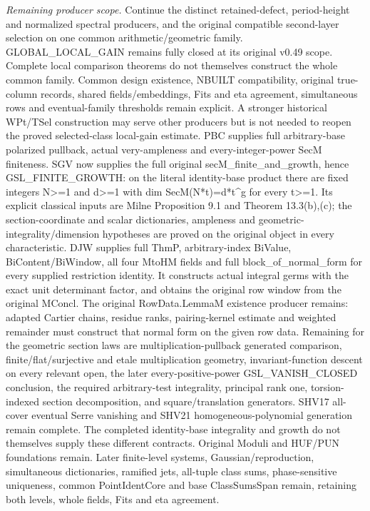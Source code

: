 \emph{Remaining producer scope.} Continue the distinct retained-defect, period-height and normalized spectral producers, and the original compatible second-layer selection on one common arithmetic/geometric family. GLOBAL\_\allowbreak LOCAL\_\allowbreak GAIN remains fully closed at its original v0.49 scope. Complete local comparison theorems do not themselves construct the whole common family. Common design existence, NBUILT compatibility, original true-column records, shared fields/embeddings, Fits and eta agreement, simultaneous rows and eventual-family thresholds remain explicit. A stronger historical WPt/TSel construction may serve other producers but is not needed to reopen the proved selected-class local-gain estimate. PBC supplies full arbitrary-base polarized pullback, actual very-ampleness and every-integer-power SecM finiteness. SGV now supplies the full original secM\_\allowbreak finite\_\allowbreak and\_\allowbreak growth, hence GSL\_\allowbreak FINITE\_\allowbreak GROWTH: on the literal identity-base product there are fixed integers N>=1 and d>=1 with dim SecM(N*t)=d*t\textasciicircum{}g for every t>=1. Its explicit classical inputs are Milne Proposition 9.1 and Theorem 13.3(b),(c); the section-coordinate and scalar dictionaries, ampleness and geometric-integrality/dimension hypotheses are proved on the original object in every characteristic. DJW supplies full ThmP, arbitrary-index BiValue, BiContent/BiWindow, all four MtoHM fields and full block\_\allowbreak of\_\allowbreak normal\_\allowbreak form for every supplied restriction identity. It constructs actual integral germs with the exact unit determinant factor, and obtains the original row window from the original MConcl. The original RowData.LemmaM existence producer remains: adapted Cartier chains, residue ranks, pairing-kernel estimate and weighted remainder must construct that normal form on the given row data. Remaining for the geometric section laws are multiplication-pullback generated comparison, finite/flat/surjective and etale multiplication geometry, invariant-function descent on every relevant open, the later every-positive-power GSL\_\allowbreak VANISH\_\allowbreak CLOSED conclusion, the required arbitrary-test integrality, principal rank one, torsion-indexed section decomposition, and square/translation generators. SHV17 all-cover eventual Serre vanishing and SHV21 homogeneous-polynomial generation remain complete. The completed identity-base integrality and growth do not themselves supply these different contracts. Original Moduli and HUF/PUN foundations remain. Later finite-level systems, Gaussian/reproduction, simultaneous dictionaries, ramified jets, all-tuple class sums, phase-sensitive uniqueness, common PointIdentCore and base ClassSumsSpan remain, retaining both levels, whole fields, Fits and eta agreement.



